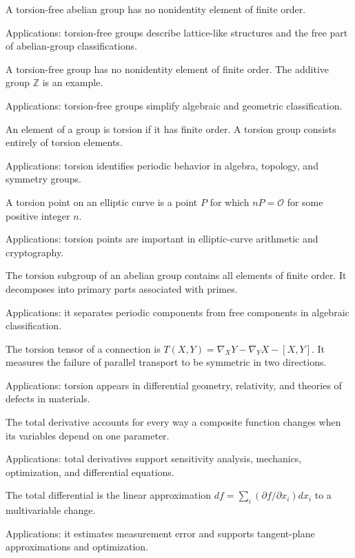 A torsion-free abelian group has no nonidentity element of finite order. \par\noindent Applications: torsion-free groups describe lattice-like structures and the free part of abelian-group classifications.

A torsion-free group has no nonidentity element of finite order. The additive group $\mathbb Z$ is an example. \par\noindent Applications: torsion-free groups simplify algebraic and geometric classification.

An element of a group is torsion if it has finite order. A torsion group consists entirely of torsion elements. \par\noindent Applications: torsion identifies periodic behavior in algebra, topology, and symmetry groups.

A torsion point on an elliptic curve is a point $P$ for which $nP=\mathcal O$ for some positive integer $n$. \par\noindent Applications: torsion points are important in elliptic-curve arithmetic and cryptography.

The torsion subgroup of an abelian group contains all elements of finite order. It decomposes into primary parts associated with primes. \par\noindent Applications: it separates periodic components from free components in algebraic classification.

The torsion tensor of a connection is $T(X,Y)=\nabla_XY-\nabla_YX-[X,Y]$. It measures the failure of parallel transport to be symmetric in two directions. \par\noindent Applications: torsion appears in differential geometry, relativity, and theories of defects in materials.

The total derivative accounts for every way a composite function changes when its variables depend on one parameter. \par\noindent Applications: total derivatives support sensitivity analysis, mechanics, optimization, and differential equations.

The total differential is the linear approximation $df=\sum_i(\partial f/\partial x_i)dx_i$ to a multivariable change. \par\noindent Applications: it estimates measurement error and supports tangent-plane approximations and optimization.

